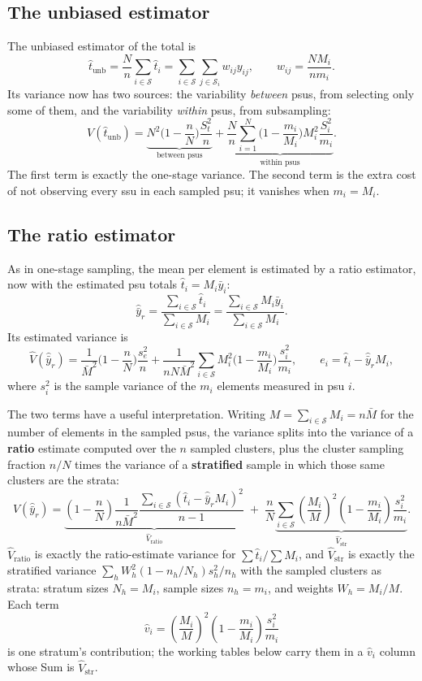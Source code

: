 \documentclass[
  letterpaper,
  DIV=11,
  numbers=noendperiod]{scrreprt}
\renewcommand{\[}{\begin{equation}}
\renewcommand{\]}{\end{equation}}
\begin{document}
\subsection{The unbiased estimator}\label{the-unbiased-estimator-1}

The unbiased estimator of the total is \[
\hat t_{\text{unb}} = \frac Nn \sum_{i\in\mathcal S} \hat t_i
 = \sum_{i\in\mathcal S}\sum_{j\in\mathcal S_i} w_{ij}y_{ij}, \qquad w_{ij} = \frac{NM_i}{nm_i}.
\] Its variance now has two sources: the variability \emph{between}
psus, from selecting only some of them, and the variability
\emph{within} psus, from subsampling: \[
V(\hat t_{\text{unb}}) = \underbrace{N^2\Big(1-\frac nN\Big)\frac{S_t^2}{n}}_{\text{between psus}}
 + \underbrace{\frac Nn \sum_{i=1}^N \Big(1-\frac{m_i}{M_i}\Big)M_i^2\frac{S_i^2}{m_i}}_{\text{within psus}} .
\] The first term is exactly the one-stage variance. The second term is
the extra cost of not observing every ssu in each sampled psu; it
vanishes when \(m_i = M_i\).

\subsection{The ratio estimator}\label{the-ratio-estimator-2}

As in one-stage sampling, the mean per element is estimated by a ratio
estimator, now with the estimated psu totals \(\hat t_i = M_i\bar y_i\):
\[
\boxed{
\hat{\bar y}_r = \frac{\sum_{i\in\mathcal S}\hat t_i}{\sum_{i\in\mathcal S}M_i} = \frac{\sum_{i\in\mathcal S}M_i\bar y_i}{\sum_{i\in\mathcal S}M_i} .}
\] Its estimated variance is \[
\hat V(\hat{\bar y}_r) = \frac{1}{\bar M^2}\Big(1-\frac nN\Big)\frac{s_e^2}{n}
 + \frac{1}{nN\bar M^2}\sum_{i\in\mathcal S}M_i^2\Big(1-\frac{m_i}{M_i}\Big)\frac{s_i^2}{m_i},
\qquad e_i = \hat t_i - \hat{\bar y}_r M_i ,
\] where \(s_i^2\) is the sample variance of the \(m_i\) elements
measured in psu \(i\).

The two terms have a useful interpretation. Writing
\(M = \sum_{i\in\mathcal S}M_i = n\bar M\) for the number of elements in
the sampled psus, the variance splits into the variance of a
\textbf{ratio} estimate computed over the \(n\) sampled clusters, plus
the cluster sampling fraction \(n/N\) times the variance of a
\textbf{stratified} sample in which those same clusters are the strata:
\[
\hat{V}(\hat{\bar y}_r) =
\underbrace{\left(1 - \frac{n}{N}\right) \frac{1}{n\bar{M}^2}
  \frac{\sum_{i\in\mathcal S} (\hat{t}_i - \hat{\bar y}_r M_i)^2}{n-1}}_{\textstyle \hat{V}_{\mathrm{ratio}}}
\;+\;
\frac{n}{N}
\underbrace{\sum_{i\in\mathcal S} \left(\frac{M_i}{M}\right)^{2}
  \left(1 - \frac{m_i}{M_i}\right)\frac{s_i^2}{m_i}}_{\textstyle \hat{V}_{\mathrm{str}}} .
\] \(\hat{V}_{\mathrm{ratio}}\) is exactly the ratio-estimate variance
for \(\sum \hat{t}_i / \sum M_i\), and \(\hat{V}_{\mathrm{str}}\) is
exactly the stratified variance \(\sum_h W_h^2(1 - n_h/N_h)s_h^2/n_h\)
with the sampled clusters as strata: stratum sizes \(N_h = M_i\), sample
sizes \(n_h = m_i\), and weights \(W_h = M_i/M\). Each term
\[\hat{v}_i = \left(\frac{M_i}{M}\right)^{2}\left(1 - \frac{m_i}{M_i}\right)\frac{s_i^2}{m_i}\]
is one stratum's contribution; the working tables below carry them in a
\(\hat{v}_i\) column whose Sum is \(\hat{V}_{\mathrm{str}}\).
\end{document}
